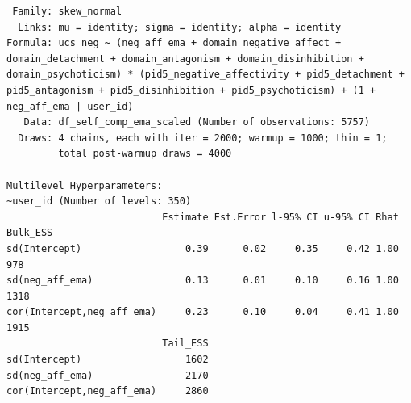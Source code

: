 \documentclass[
  11pt,
  a4paper,
  onecolumn]{article}
\begin{document}
\begin{verbatim}
 Family: skew_normal 
  Links: mu = identity; sigma = identity; alpha = identity 
Formula: ucs_neg ~ (neg_aff_ema + domain_negative_affect + domain_detachment + domain_antagonism + domain_disinhibition + domain_psychoticism) * (pid5_negative_affectivity + pid5_detachment + pid5_antagonism + pid5_disinhibition + pid5_psychoticism) + (1 + neg_aff_ema | user_id) 
   Data: df_self_comp_ema_scaled (Number of observations: 5757) 
  Draws: 4 chains, each with iter = 2000; warmup = 1000; thin = 1;
         total post-warmup draws = 4000

Multilevel Hyperparameters:
~user_id (Number of levels: 350) 
                           Estimate Est.Error l-95% CI u-95% CI Rhat Bulk_ESS
sd(Intercept)                  0.39      0.02     0.35     0.42 1.00      978
sd(neg_aff_ema)                0.13      0.01     0.10     0.16 1.00     1318
cor(Intercept,neg_aff_ema)     0.23      0.10     0.04     0.41 1.00     1915
                           Tail_ESS
sd(Intercept)                  1602
sd(neg_aff_ema)                2170
cor(Intercept,neg_aff_ema)     2860


\end{verbatim}
\end{document}
